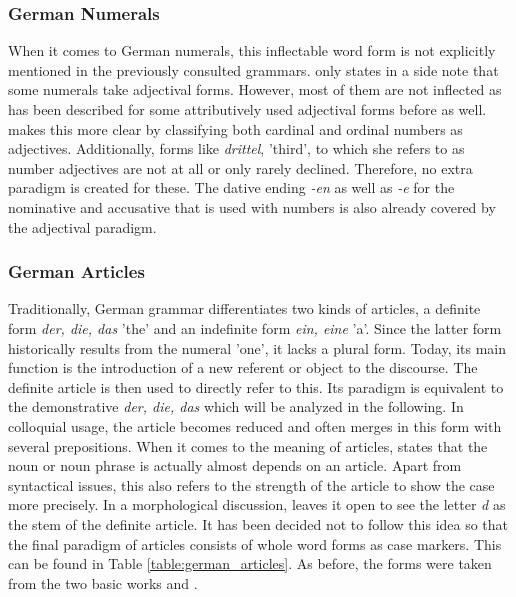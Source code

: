 \documentclass[11pt,a4paper,twoside,openright]{scrbook}
\begin{document}
\subsubsection{German Numerals}


When it comes to German numerals, this inflectable word form is not explicitly mentioned in the previously consulted grammars. \citet{eisenberg2020ger} only states in a side note that some numerals take adjectival forms. However, most of them are not inflected as has been described for some attributively used adjectival forms before as well. \citet{elsen2014ger} makes this more clear by classifying both cardinal and ordinal numbers as adjectives. Additionally, forms like \textit{drittel}, 'third', to which she refers to as number adjectives are not at all or only rarely declined. Therefore, no extra paradigm is created for these. The dative ending \textit{-en} as well as \textit{-e} for the nominative and accusative that is used with numbers is also already covered by the adjectival paradigm. 






\subsubsection{German Articles}

Traditionally, German grammar differentiates two kinds of articles, a definite form \textit{der, die, das} 'the' and an indefinite form \textit{ein, eine} 'a'. Since the latter form  historically results from the numeral 'one', it lacks a plural form. Today, its main function is the introduction of a new referent or object to the discourse. The definite article is then used to  directly refer to this. Its paradigm is equivalent to the demonstrative \textit{der, die, das} which will be analyzed in the following. In colloquial usage, the article becomes reduced and often merges in this form with several prepositions. When it comes to the meaning of articles, \citet{eisenberg2020ger} states that the noun or noun phrase is actually almost depends on an article. Apart from syntactical issues, this also refers to the strength of the article to show the case more precisely. In a morphological discussion, \citet{eisenberg2020ger} leaves it open to see the letter \textit{d} as the stem of the definite article. It has been decided not to follow this idea so that the final paradigm of articles consists of whole word forms as case markers. This can be found in Table \ref{table:german_articles}. As before, the forms were taken from the two basic works  \citet{thieroff2012ger} and \citet{eisenberg2020ger}.
\end{document}
